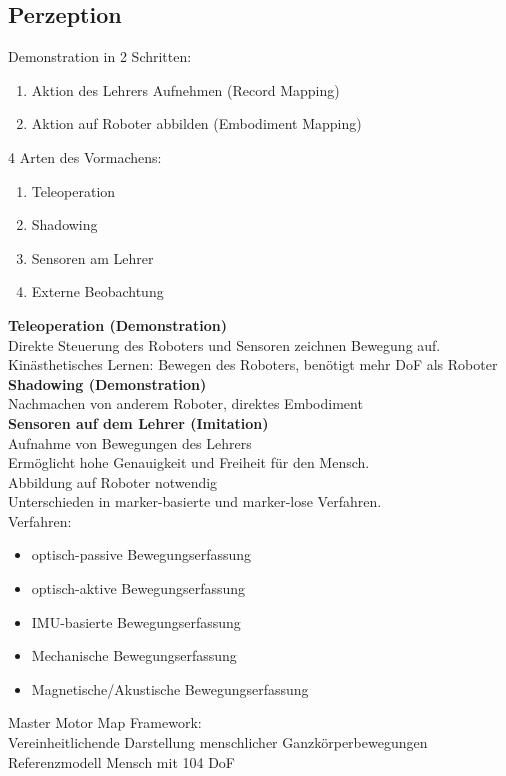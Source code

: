 \subsection{Perzeption}
Demonstration in 2 Schritten:
\begin{enumerate}
\item Aktion des Lehrers Aufnehmen (Record Mapping)
\item Aktion auf Roboter abbilden (Embodiment Mapping)
\end{enumerate}

4 Arten des Vormachens:
\begin{enumerate}
\item Teleoperation
\item Shadowing
\item Sensoren am Lehrer
\item Externe Beobachtung
\end{enumerate}

\textbf{Teleoperation (Demonstration)}\\
Direkte Steuerung des Roboters und Sensoren zeichnen Bewegung auf.\\
Kinästhetisches Lernen: Bewegen des Roboters, benötigt mehr DoF als Roboter\\

\textbf{Shadowing (Demonstration)}\\
Nachmachen von anderem Roboter, direktes Embodiment\\

\textbf{Sensoren auf dem Lehrer (Imitation)}\\
Aufnahme von Bewegungen des Lehrers\\
Ermöglicht hohe Genauigkeit und Freiheit für den Mensch.\\
Abbildung auf Roboter notwendig\\
Unterschieden in marker-basierte und marker-lose Verfahren.\\
Verfahren:
\begin{itemize}
\item optisch-passive Bewegungserfassung
\item optisch-aktive Bewegungserfassung
\item IMU-basierte Bewegungserfassung
\item Mechanische Bewegungserfassung
\item Magnetische/Akustische Bewegungserfassung
\end{itemize}

Master Motor Map Framework:\\
Vereinheitlichende Darstellung menschlicher Ganzkörperbewegungen\\
Referenzmodell Mensch mit 104 DoF\\

